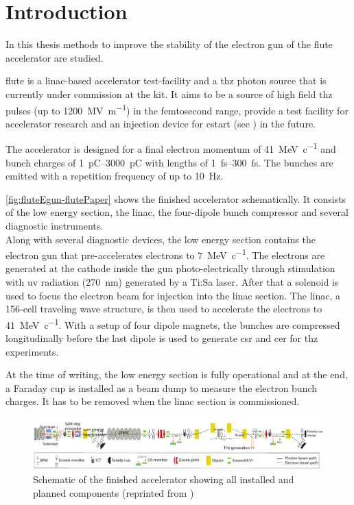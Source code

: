 \chapter{Introduction}\label{sec:intro}
In this thesis methods to improve the stability of the electron gun of the \gls{flute} accelerator are studied.

\Gls{flute} is a \gls{linac}-based accelerator test-facility and a \gls{thz} photon source that is currently under commission at the \gls{kit}. It aims to be a source of high field \gls{thz} pulses (up to \SI{1200}{\mega\volt\per\meter}) in the femtosecond range, provide a test facility for accelerator research and an injection device for \gls{cstart} (see \cite{SchaeferHaererPapash2019_1000091183}) in the future. \cite{Naknaimueang:2011zz}

The accelerator is designed for a final electron momentum of \SI{41}{\MeV\per c} and bunch charges of \SIrange{1}{3000}{\pico\coulomb} with lengths of \SIrange{1}{300}{\fs}. The bunches are emitted with a repetition frequency of up to \SI{10}{\hertz}. \cite{Malygin2018}

\autoref{fig:fluteEgun-flutePaper} shows the finished accelerator schematically. It consists of the low energy section, the \gls{linac}, the four-dipole bunch compressor and several diagnostic instruments.\\
Along with several diagnostic devices, the low energy section contains the electron gun that pre-accelerates electrons to \SI{7}{\MeV\per c}. The electrons are generated at the cathode inside the gun photo-electrically through stimulation with \gls{uv} radiation (\SI{270}{\nm}) generated by a Ti:Sa laser. After that a solenoid is used to focus the electron beam for injection into the \gls{linac} section. The \gls{linac}, a 156-cell traveling wave structure, is then used to accelerate the electrons to \SI{41}{\MeV\per c}. With a setup of four dipole magnets, the bunches are compressed longitudinally before the last dipole is used to generate \gls{csr} and \gls{cer} for \gls{thz} experiments. \cite{Nasse:IPAC13-WEPWA010}

At the time of writing, the low energy section is fully operational and at the end, a Faraday cup is installed as a beam dump to measure the electron bunch charges. It has to be removed when the \gls{linac} section is commissioned.

\begin{figure}[tb]
	\centering
	\includegraphics[width=\textwidth]{chap/StabilityOfTheElectronGun/img/flutePaper.png}
	\caption[FLUTE schematic with all components]{Schematic of the finished accelerator showing all installed and planned components (reprinted from \cite{Yan2018})}
	\label{fig:fluteEgun-flutePaper}
\end{figure}

